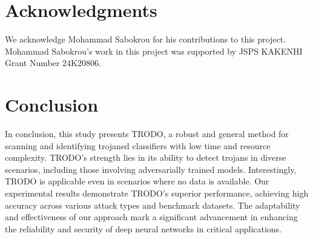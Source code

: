 
\section{Acknowledgments} We acknowledge Mohammad Sabokrou for his contributions to this project. Mohammad Sabokrou's work in this project was supported by JSPS KAKENHI Grant Number 24K20806.


\section{Conclusion}

In conclusion, this study presents TRODO, a robust and general method for scanning and identifying trojaned classifiers with low time and resource complexity. TRODO's strength lies in its ability to detect trojans in diverse scenarios, including those involving adversarially trained models. Interestingly, TRODO is applicable even in scenarios where no data is available. Our experimental results demonstrate TRODO's superior performance, achieving high accuracy across various attack types and benchmark datasets. The adaptability and effectiveness of our approach mark a significant advancement in enhancing the reliability and security of deep neural networks in critical applications.
 


